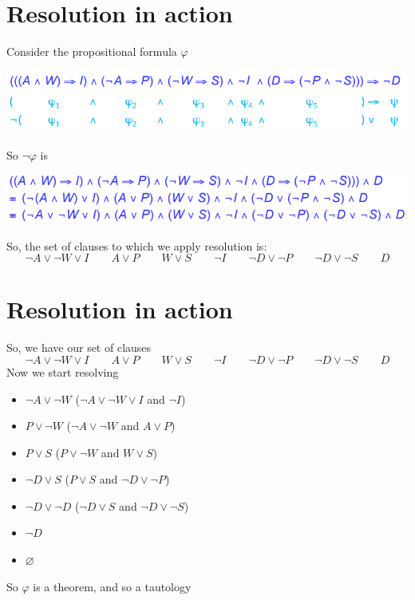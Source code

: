 \documentclass{article}[18pt]
\begin{document}
\section{Resolution in action}
Consider the propositional formula $\varphi$
\begin{center}
	\includegraphics[scale=0.7]{phi}
\end{center}
So $\lnot \varphi$ is
\begin{center}
	\includegraphics[scale=0.7]{notphi}
\end{center}
So, the set of clauses to which we apply resolution is:
$$\lnot A \lor \lnot W \lor I \qquad A \lor P \qquad W \lor S \qquad \lnot I\qquad \lnot D \lor \lnot P \qquad \lnot D \lor \lnot S \qquad D $$
\section{Resolution in action}
So, we have our set of clauses
$$\lnot A \lor \lnot W \lor I \qquad A \lor P \qquad W \lor S \qquad \lnot I\qquad \lnot D \lor \lnot P \qquad \lnot D \lor \lnot S \qquad D $$
Now we start resolving
\begin{itemize}
	\item $\lnot A\lor \lnot W$ ($\lnot A\lor \lnot W\lor I$ and $\lnot I$)
	\item $P\lor \lnot W$ ($\lnot A \lor \lnot W$ and $A\lor P$)
	\item  $P\lor S$ ($P\lor \lnot W$ and $W\lor S$)
	\item $\lnot D \lor S$ ($P\lor S$ and $\lnot D\lor \lnot P$)
	\item $\lnot D\lor \lnot D$ ($\lnot D \lor S$ and $\lnot D\lor \lnot S$)
	\item $\lnot D$
	\item $\varnothing$ 
\end{itemize}
So $\varphi$ is a theorem, and so a tautology
\end{document}
